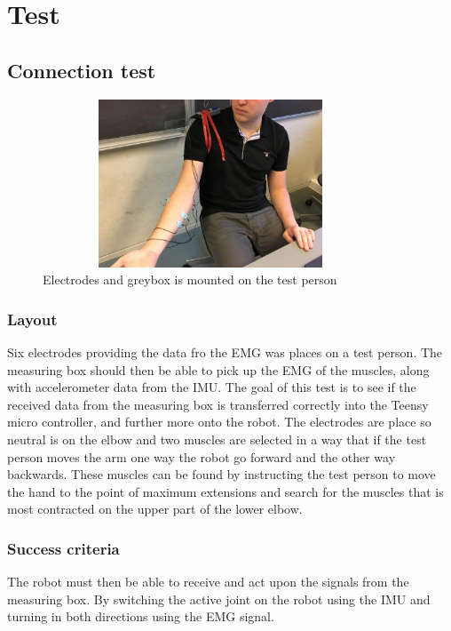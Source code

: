 \chapter{Test}\label{Test}

\section{Connection test}\label{test:Connect}
\begin{figure}[H]
    \centering
    \includegraphics[width=10cm,height=5cm]{Figures/Technical_figures/image0.jpg}
    \caption{Electrodes and greybox is mounted on the test person}
    \label{fig:connectiontest}
\end{figure}

\subsection*{Layout}
Six electrodes providing the data fro the EMG was places on a test person. The measuring box should then be able to pick up the EMG of the muscles, along with accelerometer data from the IMU. The goal of this test is to see if the received data from the measuring box is transferred correctly into the Teensy micro controller, and further more onto the robot. The electrodes are place so neutral is on the elbow and two muscles are selected in a way that if the test person moves the arm one way the robot go forward and the other way backwards. These muscles can be found by instructing the test person to move the hand to the point of maximum extensions and search for the muscles that is most contracted on the upper part of the lower elbow.

\subsection*{Success criteria}
 The robot must then be able to receive and act upon the signals from the measuring box. By switching the active joint on the robot using the IMU and turning in both directions using the EMG signal.
